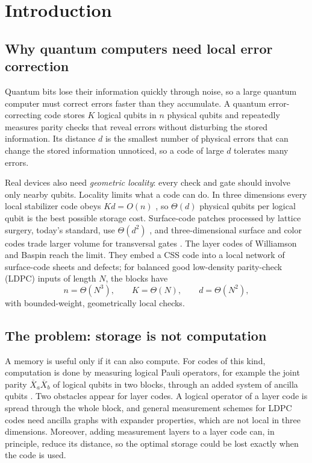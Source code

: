 \documentclass[10pt,a4paper,twocolumn]{article}
\begin{document}
\twocolumn
\section{Introduction}
\label{sec:intro}
\subsection{Why quantum computers need local error correction}
Quantum bits lose their information quickly through noise, so a large quantum
computer must correct errors faster than they accumulate.  A quantum
error-correcting code stores $K$ logical qubits in $n$ physical qubits and
repeatedly measures parity checks that reveal errors without disturbing the
stored information.  Its distance $d$ is the smallest number of physical errors
that can change the stored information unnoticed, so a code of large $d$
tolerates many errors.

Real devices also need \emph{geometric locality}: every check and gate should
involve only nearby qubits.  Locality limits what a code can do.  In three
dimensions every local stabilizer code obeys $Kd=O(n)$ \cite{BPT}, so
$\Theta(d)$ physical qubits per logical qubit is the best possible storage
cost.  Surface-code patches processed by lattice surgery, today's standard, use
$\Theta(d^2)$ \cite{HorsmanLatticeSurgery,LitinskiSurgery}, and
three-dimensional surface and color codes trade larger volume for transversal
gates \cite{VasmerBrowne}.  The layer codes of Williamson and Baspin
\cite{WilliamsonBaspinLayerCodes} reach the limit.  They embed a CSS code into a
local network of surface-code sheets and defects; for balanced good
low-density parity-check (LDPC) inputs of length $N$, the blocks have
\begin{equation}
 n=\Theta(N^3),\qquad K=\Theta(N),\qquad d=\Theta(N^2),
 \label{eq:parameters}
\end{equation}
with bounded-weight, geometrically local checks.

\subsection{The problem: storage is not computation}
A memory is useful only if it can also compute.  For codes of this kind,
computation is done by measuring logical Pauli operators, for example the joint
parity $\overline X_a\overline X_b$ of logical qubits in two blocks, through an
added system of ancilla qubits
\cite{WilliamsonYoderGauging,CowtanParallelSurgery,IdeHomological}.  Two
obstacles appear for layer codes.  A logical operator of a layer code is spread
through the whole block, and general measurement schemes for LDPC codes need
ancilla graphs with expander properties, which are not local in three
dimensions.  Moreover, adding measurement layers to a layer code can, in
principle, reduce its distance, so the optimal storage could be lost exactly
when the code is used.
\end{document}
